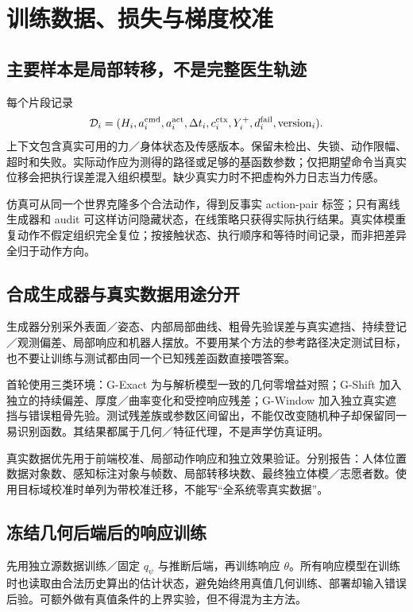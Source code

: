 \documentclass[UTF8,fontset=fandol,11pt,a4paper]{ctexart}
\theoremstyle{plain}
\theoremstyle{definition}
\theoremstyle{remark}
\numberwithin{equation}{section}
\begin{document}
\section{训练数据、损失与梯度校准}
\label{sec:data}
\subsection{主要样本是局部转移，不是完整医生轨迹}
每个片段记录
\begin{equation}
\mathcal D_i=(H_i,a_i^{\rm cmd},a_i^{\rm act},\Delta t_i,
 c_i^{\rm ctx},Y_i^+,d_i^{\rm fail},\mathrm{version}_i).
\end{equation}
上下文包含真实可用的力／身体状态及传感版本。保留未检出、失锁、动作限幅、超时和失败。实际动作应为测得的路径或足够的基函数参数；仅把期望命令当真实位移会把执行误差混入组织模型。缺少真实力时不把虚构外力日志当力传感。

仿真可从同一个世界克隆多个合法动作，得到反事实 action-pair 标签；只有离线生成器和 audit 可这样访问隐藏状态，在线策略只获得实际执行结果。真实体模重复动作不假定组织完全复位；按接触状态、执行顺序和等待时间记录，而非把差异全归于动作方向。

\subsection{合成生成器与真实数据用途分开}
生成器分别采外表面／姿态、内部局部曲线、粗骨先验误差与真实遮挡、持续登记／观测偏差、局部响应和机器人摆放。不要用某个方法的参考路径决定测试目标，也不要让训练与测试都由同一个已知残差函数直接喂答案。

首轮使用三类环境：G-Exact 为与解析模型一致的几何零增益对照；G-Shift 加入独立的持续偏差、厚度／曲率变化和受控响应残差；G-Window 加入独立真实遮挡与错误粗骨先验。测试残差族或参数区间留出，不能仅改变随机种子却保留同一易识别函数。其结果都属于几何／特征代理，不是声学仿真证明。

真实数据优先用于前端校准、局部动作响应和独立效果验证。分别报告：人体位置数据对象数、感知标注对象与帧数、局部转移块数、最终独立体模／志愿者数。使用目标域校准时单列为带校准迁移，不能写“全系统零真实数据”。

\subsection{冻结几何后端后的响应训练}
先用独立源数据训练／固定 $q_\psi$ 与推断后端，再训练响应 $\theta$。所有响应模型在训练时也读取由合法历史算出的估计状态，避免始终用真值几何训练、部署却输入错误后验。可额外做有真值条件的上界实验，但不得混为主方法。
\end{document}
